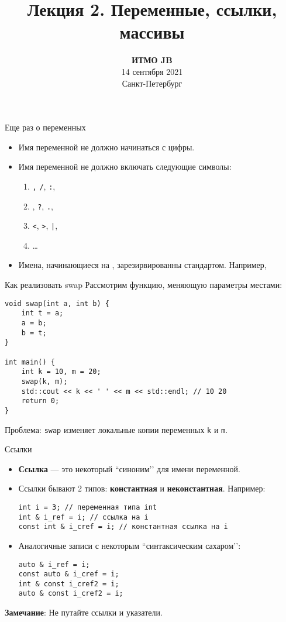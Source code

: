 \documentclass{beamer}
\title{Лекция 2. Переменные, ссылки, массивы}
\date{
   \textbf{ИТМО JB}\\
   14 сентября 2021 \\
   Санкт-Петербург
}
\begin{document}
\begin{frame} 
  \titlepage
\end{frame}

\begin{frame}[fragile]{Еще раз о переменных}
    \begin{itemize}
        \item Имя переменной не должно начинаться с цифры.
        \item Имя переменной не должно включать следующие символы: \\
        \begin{enumerate}
            \item {\tt ,} {\tt /}, {\tt :},
            \item {\tt *}, {\tt ?}, {\tt .},
            \item {\tt <}, {\tt >}, {\tt |},
            \item \dots
        \end{enumerate}
        \item Имена, начинающиеся на \code{\_\_}, зарезирвированны стандартом. Например, 
    \end{itemize}
\end{frame}

\begin{frame}[fragile]{Как реализовать swap}
    Рассмотрим функцию, меняющую параметры местами:
    \begin{lstlisting}
void swap(int a, int b) {
    int t = a;
    a = b;
    b = t;
}

int main() {
    int k = 10, m = 20;
    swap(k, m);
    std::cout << k << ' ' << m << std::endl; // 10 20
    return 0;
}
    \end{lstlisting}
    Проблема: {\tt swap} изменяет локальные копии переменных {\tt k} и {\tt m}.
\end{frame}

\begin{frame}[fragile]{Ссылки}
    \begin{itemize}
        \item {\bf Ссылка} — это некоторый ``синоним’’ для имени переменной.
        \item Ссылки бывают 2 типов: {\bf константная} и {\bf неконстантная}. Например:
            \begin{lstlisting}
int i = 3; // переменная типа int
int & i_ref = i; // ссылка на i
const int & i_cref = i; // константная ссылка на i
            \end{lstlisting}
        \item Аналогичные записи с некоторым ``синтаксическим сахаром’’:
            \begin{lstlisting}
auto & i_ref = i;
const auto & i_cref = i;
int & const i_cref2 = i;
auto & const i_cref2 = i;
            \end{lstlisting}
    \end{itemize}
    {\bf Замечание}: Не путайте ссылки и указатели.
\end{frame}
\end{document}
